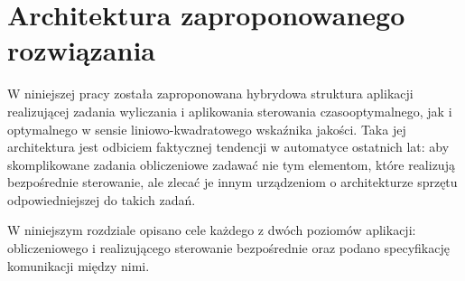 \chapter{Architektura zaproponowanego rozwiązania}
\label{cha:arch}

W niniejszej pracy została zaproponowana hybrydowa struktura aplikacji realizującej zadania wyliczania i aplikowania sterowania czasooptymalnego, jak i optymalnego w sensie liniowo-kwadratowego wskaźnika jakości.
Taka jej architektura jest odbiciem faktycznej tendencji w automatyce ostatnich lat: aby skomplikowane zadania obliczeniowe zadawać nie tym elementom, które realizują bezpośrednie sterowanie, ale zlecać je innym urządzeniom o architekturze sprzętu odpowiedniejszej do takich zadań.

W niniejszym rozdziale opisano cele każdego z dwóch poziomów aplikacji: obliczeniowego i realizującego sterowanie bezpośrednie oraz podano specyfikację komunikacji między nimi.





